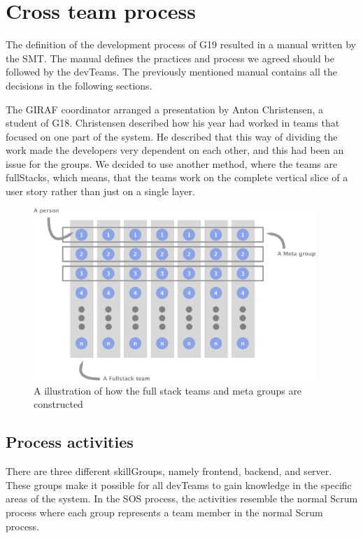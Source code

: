 \section{Cross team process}\label{sec:crossTeam}
The definition of the development process of \gls{G19} resulted in a manual\cite{processManual} written by the \gls{SMT}. The manual defines the practices and process we agreed should be followed by the \glspl{devTeam}. The previously mentioned manual contains all the decisions in the following sections.

The GIRAF coordinator arranged a presentation by Anton Christensen, a student of \gls{G18}. Christensen described how his year had worked in teams that focused on one part of the system. He described that this way of dividing the work made the developers very dependent on each other, and this had been an issue for the groups. We decided to use another method, where the teams are \Glspl{fullStack}, which means, that the teams work on the complete vertical slice of a user story rather than just on a single layer.
\begin{figure}[H]
        \begin{center}
            \includegraphics[width=0.95\textwidth]{figures/MetaGroupsFigure.pdf}
        \end{center}
        \caption{A illustration of how the full stack teams and meta groups are constructed}
        \label{fig:MetaGroupsFigure}
\end{figure}
\subsection{Process activities}
There are three different \glspl{skillGroup}, namely frontend, backend, and server. These groups make it possible for all \glspl{devTeam} to gain knowledge in the specific areas of the system. In the \gls{SOS} process, the activities resemble the normal Scrum process where each group represents a team member in the normal Scrum process.


